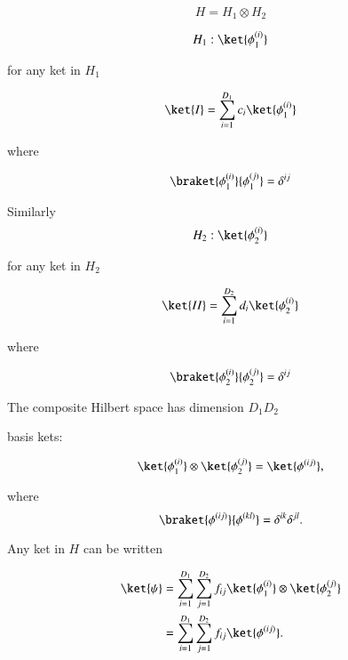 \begin{equation}\label{eqn:qmTwoL1:50}
H = H_1 \otimes H_2
\end{equation}

\begin{equation}\label{eqn:qmTwoL1:70}
H_1 : { \ket{\phi_1^{(i)}} }
\end{equation}

for any ket in $H_1$

\begin{equation}\label{eqn:qmTwoL1:90}
\ket{I} = \sum_{i=1}^{D_1} c_i \ket{\phi_1^{(i)}} 
\end{equation}

where

\begin{equation}\label{eqn:qmTwoL1:110}
\braket{ \phi_1^{(i)}}{ \phi_1^{(j)}} = \delta^{i j}
\end{equation}

Similarly
\begin{equation}\label{eqn:qmTwoL1:130}
H_2 : { \ket{\phi_2^{(i)}} }
\end{equation}

for any ket in $H_2$

\begin{equation}\label{eqn:qmTwoL1:150}
\ket{II} = \sum_{i=1}^{D_2} d_i \ket{\phi_2^{(i)}} 
\end{equation}

where

\begin{equation}\label{eqn:qmTwoL1:170}
\braket{ \phi_2^{(i)}}{ \phi_2^{(j)}} = \delta^{i j}
\end{equation}

The composite Hilbert space has dimension $D_1 D_2$

basis kets:

\begin{equation}\label{eqn:qmTwoL1:190}
\ket{ \phi_1^{(i)}} \otimes \ket{ \phi_2^{(j)}}  = \ket{ \phi^{(ij)}},
\end{equation}

where
\begin{equation}\label{eqn:qmTwoL1:210}
\braket{ \phi^{(ij)}}{ \phi^{(kl)}} = \delta^{ik} \delta^{jl}.
\end{equation}

Any ket in $H$ can be written

\begin{align*}
\ket{\psi} 
&= 
\sum_{i = 1}^{D_1}
\sum_{j = 1}^{D_2}
f_{ij}
\ket{ \phi_1^{(i)}} \otimes \ket{ \phi_2^{(j)}}  \\
&= 
\sum_{i = 1}^{D_1}
\sum_{j = 1}^{D_2}
f_{ij}
\ket{ \phi^{(ij)}}.
\end{align*}

